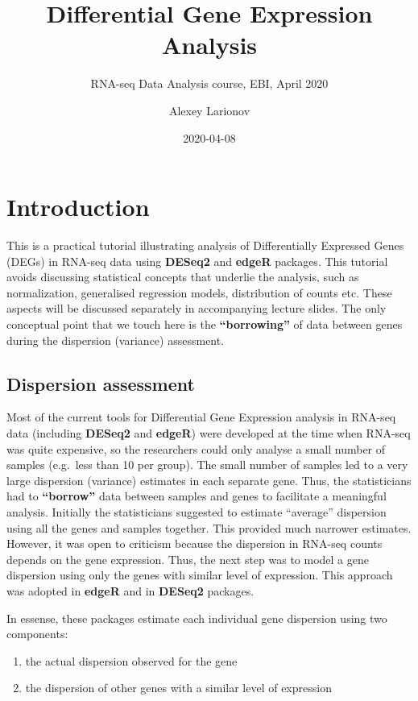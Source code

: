 \documentclass[]{book}
\title{Differential Gene Expression Analysis}
\subtitle{RNA-seq Data Analysis course, EBI, April 2020}
\author{Alexey Larionov}
\date{2020-04-08}
\providecommand{\tightlist}{%
  \setlength{\itemsep}{0pt}\setlength{\parskip}{0pt}}
\begin{document}
\maketitle

{
\setcounter{tocdepth}{1}
\tableofcontents
}
\chapter{Introduction}\label{introduction}

This is a practical tutorial illustrating analysis of Differentially
Expressed Genes (DEGs) in RNA-seq data using \textbf{DESeq2} and
\textbf{edgeR} packages. This tutorial avoids discussing statistical
concepts that underlie the analysis, such as normalization, generalised
regression models, distribution of counts etc. These aspects will be
discussed separately in accompanying lecture slides. The only conceptual
point that we touch here is the \textbf{``borrowing''} of data between
genes during the dispersion (variance) assessment.

\section{Dispersion assessment}\label{dispersion-assessment}

Most of the current tools for Differential Gene Expression analysis in
RNA-seq data (including \textbf{DESeq2} and \textbf{edgeR}) were
developed at the time when RNA-seq was quite expensive, so the
researchers could only analyse a small number of samples (e.g.~less than
10 per group). The small number of samples led to a very large
dispersion (variance) estimates in each separate gene. Thus, the
statisticians had to \textbf{``borrow''} data between samples and genes
to facilitate a meaningful analysis. Initially the statisticians
suggested to estimate ``average'' dispersion using all the genes and
samples together. This provided much narrower estimates. However, it was
open to criticism because the dispersion in RNA-seq counts depends on
the gene expression. Thus, the next step was to model a gene dispersion
using only the genes with similar level of expression. This approach was
adopted in \textbf{edgeR} and in \textbf{DESeq2} packages.

In essense, these packages estimate each individual gene dispersion
using two components:

\begin{enumerate}
\def\labelenumi{\arabic{enumi})}
\tightlist
\item
  the actual dispersion observed for the gene\\
\item
  the dispersion of other genes with a similar level of expression
\end{enumerate}
\end{document}
